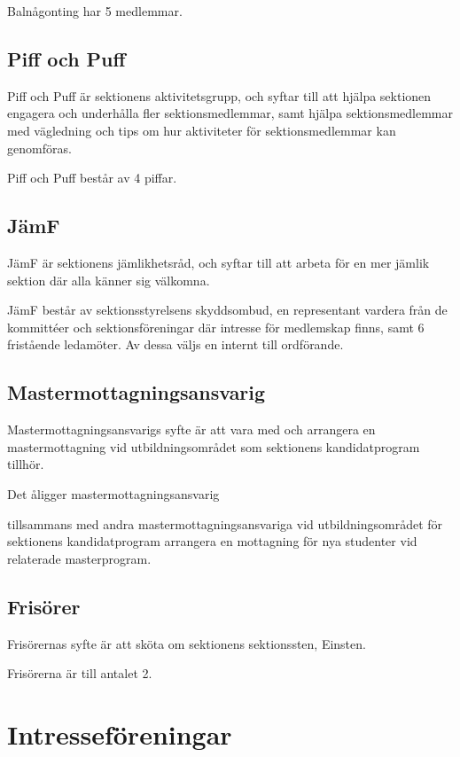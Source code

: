 \documentclass{styrdokument}
\begin{document}
\? Balnågonting har 5 medlemmar.

\subsection{Piff och Puff}
\? Piff och Puff är sektionens aktivitetsgrupp, och syftar till att hjälpa sektionen engagera och underhålla fler sektionsmedlemmar, samt hjälpa sektionsmedlemmar med vägledning och tips om hur aktiviteter för sektionsmedlemmar kan genomföras.

\? Piff och Puff består av 4 piffar.
		
\subsection{JämF}
\? JämF är sektionens jämlikhetsråd, och syftar till att arbeta för en mer jämlik sektion där alla känner sig välkomna.
	    
\? JämF består av sektionsstyrelsens skyddsombud, en representant vardera från de kommittéer och sektionsföreningar där intresse för medlemskap finns, samt 6 fristående ledamöter.
Av dessa väljs en internt till ordförande.
	    
\subsection{Mastermottagningsansvarig}
\? Mastermottagningsansvarigs syfte är att vara med och arrangera en mastermottagning vid utbildningsområdet som sektionens kandidatprogram tillhör.
        
\? Det åligger mastermottagningsansvarig
\begin{aligganden}
    \item tillsammans med andra mastermottagningsansvariga vid utbildningsområdet för sektionens kandidatprogram arrangera en mottagning för nya studenter vid relaterade masterprogram.
\end{aligganden}
        
\subsection{Frisörer}
\? Frisörernas syfte är att sköta om sektionens sektionssten, Einsten.
        
\? Frisörerna är till antalet 2.

\section{Intresseföreningar}
\end{document}
